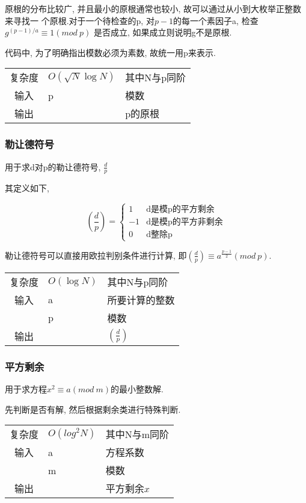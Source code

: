 原根的分布比较广, 并且最小的原根通常也较小, 故可以通过从小到大枚举正整数来寻找一
个原根.对于一个待检查的p, 对$p - 1$的每一个素因子a, 检查$g^{(p-1)/a} \equiv 1(mod\ p)$
是否成立, 如果成立则说明g不是原根.

代码中, 为了明确指出模数必须为素数, 故统一用p来表示.
\begin{longtable}{|c|l|l|}
复杂度 & $O(\sqrt{N}\log N)$ & 其中N与p同阶  \\
输入 & p & 模数 \\
输出 &  & p的原根 \\
\end{longtable}



        \subsubsection{勒让德符号}\small
用于求d对p的勒让德符号, $\frac{d}{p}$

其定义如下, 

\[ (\frac{d}{p}) = 
\begin{cases}
 1 & \text{d是模p的平方剩余} \\
 -1 & \text{d是模p的平方非剩余} \\
 0 & \text{d整除p}
\end{cases} \]

勒让德符号可以直接用欧拉判别条件进行计算, 即$(\frac{d}{p}) \equiv a ^ {\frac{p-1}{2}}(mod\ p)$.

\begin{longtable}{|c|l|l|}
复杂度 & $O(\log N)$ & 其中N与p同阶  \\
输入 & a & 所要计算的整数 \\
 & p & 模数 \\
输出 &  & $(\frac{d}{p})$ \\
\end{longtable}



        \subsubsection{平方剩余}\small
用于求方程$x^{2} \equiv a(mod\ m)$的最小整数解.

先判断是否有解, 然后根据剩余类进行特殊判断.
\begin{longtable}{|c|l|l|}
复杂度 & $O(log^{2}N)$ & 其中N与m同阶  \\
输入 & a & 方程系数 \\
 & m & 模数 \\
输出 &  & 平方剩余$x$ \\
\end{longtable}



